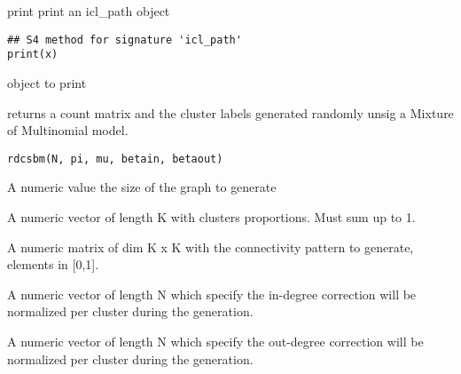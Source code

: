 \documentclass[letterpaper]{book}
\begin{document}
%
\begin{Description}\relax
print
print an icl\_path object
\end{Description}
%
\begin{Usage}
\begin{verbatim}
## S4 method for signature 'icl_path'
print(x)
\end{verbatim}
\end{Usage}
%
\begin{Arguments}
\begin{ldescription}
\item[\code{x}]  object to print
\end{ldescription}
\end{Arguments}
%
\begin{Description}\relax
{} returns a count matrix and the cluster labels generated randomly unsig a Mixture of Multinomial model.
\end{Description}
%
\begin{Usage}
\begin{verbatim}
rdcsbm(N, pi, mu, betain, betaout)
\end{verbatim}
\end{Usage}
%
\begin{Arguments}
\begin{ldescription}
\item[\code{N}] A numeric value the size of the graph to generate

\item[\code{pi}] A numeric vector of length K with clusters proportions. Must sum up to 1.

\item[\code{mu}] A numeric matrix of dim K x K with the connectivity pattern to generate, elements in [0,1].

\item[\code{betain}] A numeric vector of length N which specify the in-degree correction will be normalized per cluster during the generation.

\item[\code{betaout}] A numeric vector of length N which specify the out-degree correction will be normalized per cluster during the generation.
\end{ldescription}
\end{Arguments}
\end{document}
